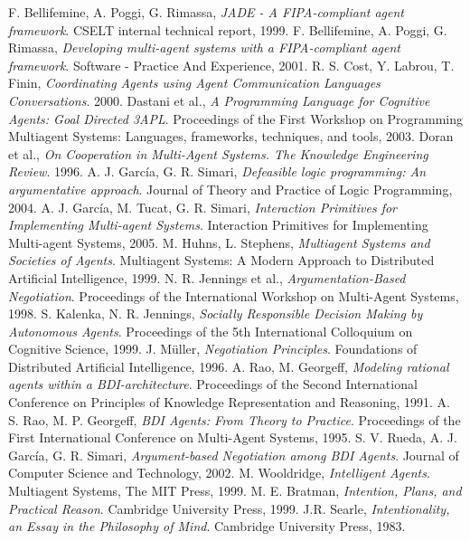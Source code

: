 \begin{thebibliography}{99}
  F. Bellifemine, A. Poggi, G. Rimassa,
  \emph{JADE - A FIPA-compliant agent framework}.
  CSELT internal technical report,
  1999.
  F. Bellifemine, A. Poggi, G. Rimassa,
  \emph{Developing multi-agent systems with a FIPA-compliant agent framework}.
  Software - Practice And Experience,
  2001.
  R. S. Cost, Y. Labrou, T. Finin,
  \emph{Coordinating Agents using Agent Communication Languages Conversations}.
  2000. 	
  Dastani et al.,
  \emph{A Programming Language for Cognitive Agents: Goal Directed 3APL}.
  Proceedings of the First Workshop on Programming Multiagent Systems: Languages, frameworks, techniques, and tools,
  2003.
  Doran et al.,
  \emph{On Cooperation in Multi-Agent Systems. The Knowledge Engineering Review}.
  1996.
  A. J. García, G. R. Simari,
  \emph{Defeasible logic programming: An argumentative approach}.
  Journal of Theory and Practice of Logic Programming,
  2004.
  A. J. García, M. Tucat, G. R. Simari,
  \emph{Interaction Primitives for Implementing Multi-agent Systems}.
  Interaction Primitives for Implementing Multi-agent Systems,
  2005.
  M. Huhns, L. Stephens,
  \emph{Multiagent Systems and Societies of Agents}.
  Multiagent Systems: A Modern Approach to Distributed Artificial Intelligence,
  1999.
  N. R. Jennings et al.,
  \emph{Argumentation-Based Negotiation}.
  Proceedings of the International Workshop on Multi-Agent Systems,
  1998.
  S. Kalenka, N. R. Jennings,
  \emph{Socially Responsible Decision Making by Autonomous Agents}.
  Proceedings of the 5th International Colloquium on Cognitive Science,
  1999.
  J. Müller,
  \emph{Negotiation Principles}.
  Foundations of Distributed Artificial Intelligence,
  1996.
  A. Rao, M. Georgeff,
  \emph{Modeling rational agents within a BDI-architecture}.
  Proceedings of the Second International Conference on Principles of Knowledge Representation and Reasoning,
  1991.
  A. S. Rao, M. P. Georgeff,
  \emph{BDI Agents: From Theory to Practice}.
  Proceedings of the First International Conference on Multi-Agent Systems,
  1995.
  S. V. Rueda, A. J. García, G. R. Simari,
  \emph{Argument-based Negotiation among BDI Agents}.
  Journal of Computer Science and Technology,
  2002.
  M. Wooldridge,
  \emph{Intelligent Agents}.
  Multiagent Systems, The MIT Press,
  1999.
    M. E. Bratman,
    \emph{Intention, Plans, and Practical Reason}.
    Cambridge University Press,
    1999.
	J.R. Searle,
  \emph{Intentionality, an Essay in the Philosophy of Mind}.
  Cambridge University Press,
  1983.

\end{thebibliography}